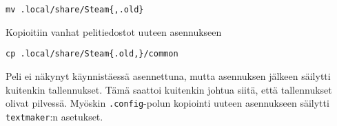 \documentclass[main.tex]{subfiles}
\begin{document}
\begin{lstlisting}
mv .local/share/Steam{,.old} 
\end{lstlisting}

Kopioitiin vanhat pelitiedostot uuteen asennukseen

\begin{lstlisting}
cp .local/share/Steam{.old,}/common 
\end{lstlisting}

Peli ei näkynyt käynnistäessä asennettuna, mutta asennuksen jälkeen säilytti kuitenkin tallennukset. Tämä saattoi kuitenkin johtua siitä, että tallennukset olivat pilvessä. Myöskin \texttt{.config}-polun kopiointi uuteen asennukseen säilytti \texttt{textmaker}:n asetukset.
\end{document}
